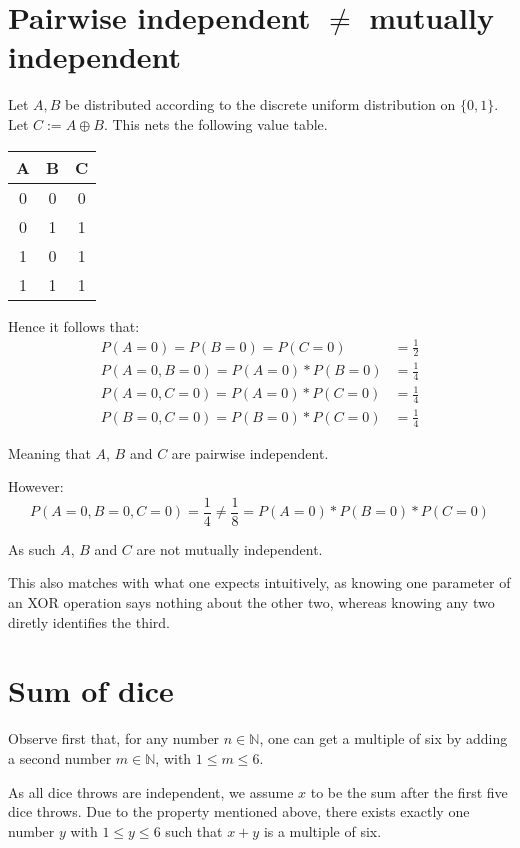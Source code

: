 \documentclass[a4paper]{scrreprt}
\begin{document}
\section{Pairwise independent $\neq$ mutually independent}

Let $A, B$ be distributed according to the discrete uniform distribution on
$\{0, 1\}$. Let $C := A \oplus B$. This nets the following value table.
\\

\begin{tabular}{|c|c|c|}
	\hline
	A & B & C \\
	\hline
	0 & 0 & 0 \\
	\hline
	0 & 1 & 1 \\
	\hline
	1 & 0 & 1 \\
	\hline
	1 & 1 & 1 \\
	\hline
\end{tabular}

Hence it follows that:
\begin{align*}
	P(A=0) = P(B=0) = P(C=0) & = \frac{1}{2} \\
	P(A=0, B=0) = P(A=0) * P(B=0) & = \frac{1}{4} \\
	P(A=0, C=0) = P(A=0) * P(C=0) & = \frac{1}{4} \\
	P(B=0, C=0) = P(B=0) * P(C=0) & = \frac{1}{4}
\end{align*}

Meaning that $A$, $B$ and $C$ are pairwise independent. 

However:
\[
	P(A=0, B=0, C=0) = \frac{1}{4} \neq \frac{1}{8} = P(A=0) * P(B=0) * P(C=0)
\]

As such $A$, $B$ and $C$ are not mutually independent.

This also matches with what one expects intuitively, as knowing one parameter
of an XOR operation says nothing about the other two, whereas knowing any two
diretly identifies the third.

\section{Sum of dice}

Observe first that, for any number $n \in \mathbb{N}$, one can get a multiple
of six by adding a second number $m \in \mathbb{N}$, with $1 \leq m \leq 6$.

As all dice throws are independent, we assume $x$ to be the sum after the first
five dice throws. Due to the property mentioned above, there exists exactly one
number $y$ with $1 \leq y \leq 6$ such that $x + y$ is a multiple of six.
\end{document}
